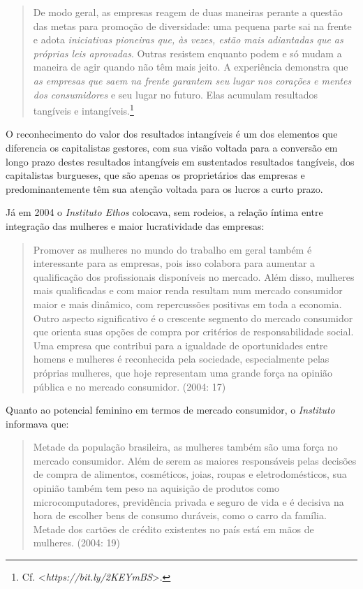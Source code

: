 \begin{quote}
De modo geral, as empresas reagem de duas maneiras perante a questão das
metas para promoção de diversidade: uma pequena parte sai na frente e
adota \emph{iniciativas pioneiras que, às vezes, estão mais adiantadas
que as próprias leis aprovadas}. Outras resistem enquanto podem e só
mudam a maneira de agir quando não têm mais jeito. A experiência
demonstra que \emph{as empresas que saem na frente garantem seu lugar
nos corações e mentes dos consumidores} e seu lugar no futuro. Elas
acumulam resultados tangíveis e intangíveis.\footnote{Cf.
  \textless{}\emph{https://bit.ly/2KEYmBS}\textgreater{}.}
\end{quote}

O reconhecimento do valor dos resultados intangíveis é um dos elementos
que diferencia os capitalistas gestores, com sua visão voltada para a
conversão em longo prazo destes resultados intangíveis em sustentados
resultados tangíveis, dos capitalistas burgueses, que são apenas os
proprietários das empresas e predominantemente têm sua atenção voltada
para os lucros a curto prazo.

Já em 2004 o \emph{Instituto Ethos} colocava, sem rodeios, a relação
íntima entre integração das mulheres e maior lucratividade das empresas:

\begin{quote}
Promover as mulheres no mundo do trabalho em geral também é interessante
para as empresas, pois isso colabora para aumentar a qualificação dos
profissionais disponíveis no mercado. Além disso, mulheres mais
qualificadas e com maior renda resultam num mercado consumidor maior e
mais dinâmico, com repercussões positivas em toda a economia. Outro
aspecto significativo é o crescente segmento do mercado consumidor que
orienta suas opções de compra por critérios de responsabilidade social.
Uma empresa que contribui para a igualdade de oportunidades entre homens
e mulheres é reconhecida pela sociedade, especialmente pelas próprias
mulheres, que hoje representam uma grande força na opinião pública e no
mercado consumidor. (2004: 17)
\end{quote}

Quanto ao potencial feminino em termos de mercado consumidor, o
\emph{Instituto} informava que:

\begin{quote}
Metade da população brasileira, as mulheres também são uma força no
mercado consumidor. Além de serem as maiores responsáveis pelas decisões
de compra de alimentos, cosméticos, joias, roupas e eletrodomésticos,
sua opinião também tem peso na aquisição de produtos como
microcomputadores, previdência privada e seguro de vida e é decisiva na
hora de escolher bens de consumo duráveis, como o carro da família.
Metade dos cartões de crédito existentes no país está em mãos de
mulheres. (2004: 19)
\end{quote}

